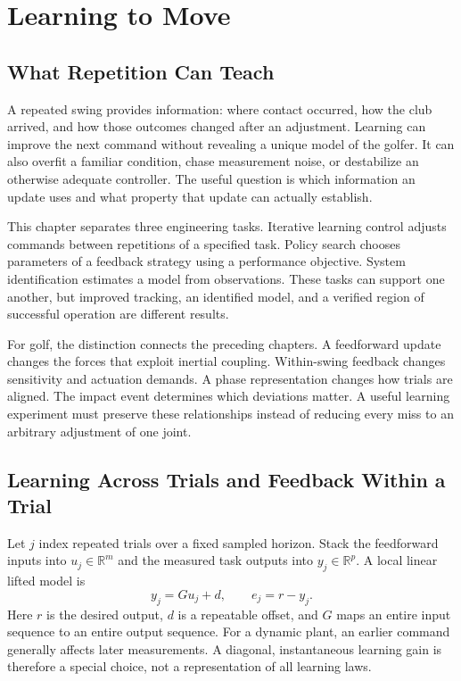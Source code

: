 \documentclass[12pt, openany]{book}
\theoremstyle{plain}
\begin{document}
\setcounter{chapter}{9}

\chapter{Learning to Move}
\label{ch:learning_to_move}
\begingroup
\raggedbottom

\section{What Repetition Can Teach}

A repeated swing provides information: where contact occurred, how the club arrived, and how those outcomes changed after an adjustment. Learning can improve the next command without revealing a unique model of the golfer. It can also overfit a familiar condition, chase measurement noise, or destabilize an otherwise adequate controller. The useful question is which information an update uses and what property that update can actually establish.

This chapter separates three engineering tasks. Iterative learning control adjusts commands between repetitions of a specified task. Policy search chooses parameters of a feedback strategy using a performance objective. System identification estimates a model from observations. These tasks can support one another, but improved tracking, an identified model, and a verified region of successful operation are different results.

For golf, the distinction connects the preceding chapters. A feedforward update changes the forces that exploit inertial coupling. Within-swing feedback changes sensitivity and actuation demands. A phase representation changes how trials are aligned. The impact event determines which deviations matter. A useful learning experiment must preserve these relationships instead of reducing every miss to an arbitrary adjustment of one joint.

\section{Learning Across Trials and Feedback Within a Trial}

Let $j$ index repeated trials over a fixed sampled horizon. Stack the feedforward inputs into $u_j\in\mathbb R^m$ and the measured task outputs into $y_j\in\mathbb R^p$. A local linear lifted model is
\begin{equation}
y_j=G u_j+d,\qquad e_j=r-y_j .
\end{equation}
Here $r$ is the desired output, $d$ is a repeatable offset, and $G$ maps an entire input sequence to an entire output sequence. For a dynamic plant, an earlier command generally affects later measurements. A diagonal, instantaneous learning gain is therefore a special choice, not a representation of all learning laws.
\end{document}
